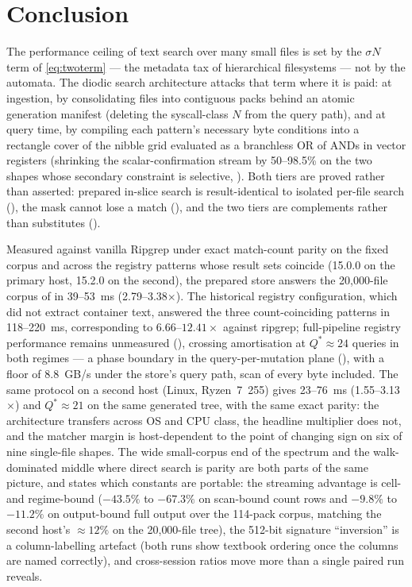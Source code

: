 \documentclass[11pt,letterpaper]{article}
\begin{document}
\section{Conclusion}
The performance ceiling of text search over many small files is set by the
$\sigma N$ term of \eqref{eq:twoterm} --- the metadata tax of hierarchical
filesystems --- not by the automata. The diodic search architecture attacks
that term where it is paid: at ingestion, by consolidating files into
contiguous packs behind an atomic generation manifest (deleting the
syscall-class $N$ from
the query path), and at query time, by compiling each pattern's necessary
byte conditions into a rectangle cover of the nibble grid evaluated as a
branchless OR of ANDs in vector registers (shrinking the scalar-confirmation
stream by 50--98.5\% on the two shapes whose secondary constraint is
selective, ). Both tiers are
proved rather than asserted: prepared in-slice search is result-identical
to isolated per-file search (), the mask cannot lose
a match (), and the two tiers are complements rather than
substitutes ().

Measured against vanilla Ripgrep under exact match-count parity on the fixed
corpus and across the registry patterns whose result sets coincide
(15.0.0 on the primary host, 15.2.0 on the second), the
prepared store answers the 20{,}000-file corpus of  in
39--53~ms
(2.79--3.38$\times$). The historical registry configuration, which did not
extract container text, answered the three count-coinciding patterns in
118--220~ms, corresponding to $6.66$--$12.41\times$ against ripgrep; full-pipeline
registry performance remains unmeasured (), crossing amortisation at
$Q^{*}\approx 24$ queries in both regimes --- a phase boundary in the
query-per-mutation plane (), with a floor of 8.8~GB/s under
the store's query path, scan of every byte included. The same protocol on a second host
(Linux, Ryzen~7~255) gives 23--76~ms (1.55--3.13$\times$) and
$Q^{*}\approx 21$ on the same generated tree, with the same exact parity:
the architecture transfers across OS and CPU class, the headline
multiplier does not, and the matcher margin is host-dependent to the point
of changing sign on six of nine single-file shapes. The wide
small-corpus end of the spectrum and the
walk-dominated middle where direct search is parity are both parts of the
same picture, and  states which constants are portable:
the streaming advantage is cell- and regime-bound ($-43.5\%$ to $-67.3\%$ on
scan-bound count rows and $-9.8\%$ to $-11.2\%$ on output-bound full output
over the 114-pack corpus, matching the second host's $\approx 12\%$ on the
20{,}000-file tree), the 512-bit signature
``inversion'' is a column-labelling artefact (both runs show textbook
ordering once the columns are named correctly), and
cross-session ratios move more than a single paired run reveals.
\end{document}
